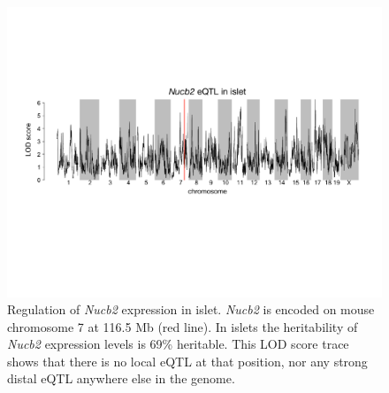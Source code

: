 \documentclass[
]{article}
\begin{document}
\begin{figure}[ht!]
\includegraphics[width=\textwidth]{Figures/Supplemental_FigX_Nucb2_eQTL.pdf} 
\caption{Regulation of \textit{Nucb2} expression in islet. \textit{Nucb2} 
is encoded on mouse chromosome 7 at 116.5 Mb (red line). In islets the 
heritability of \textit{Nucb2} expression levels is 69\% heritable. This 
LOD score trace shows that there is no local eQTL at that position, nor 
any strong distal eQTL anywhere else in the genome. 
}
\label{fig:Nucb2_eqtl}
\end{figure}

\medskip



\end{document}
